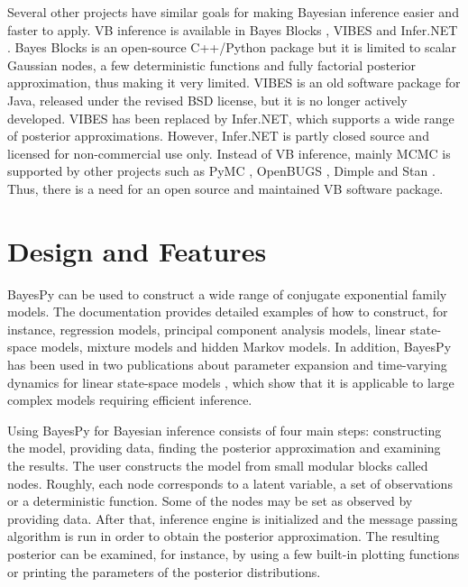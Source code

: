 \documentclass[twoside,11pt]{article}
\begin{document}
Several other projects have similar goals for making Bayesian inference easier
and faster to apply.  VB inference is available in Bayes Blocks
\citep{Raiko:2007}, VIBES \citep{Bishop:2002} and Infer.NET \citep{Infer.NET}.
Bayes Blocks is an open-source C++/Python package but it is limited to scalar
Gaussian nodes, a few deterministic functions and fully factorial posterior
approximation, thus making it very limited.  VIBES is an old software package
for Java, released under the revised BSD license, but it is no longer actively
developed.  VIBES has been replaced by Infer.NET, which supports a wide range of
posterior approximations.  However, Infer.NET is partly closed source and
licensed for non-commercial use only.  Instead of VB inference, mainly MCMC is
supported by other projects such as PyMC \citep{PyMC}, OpenBUGS \citep{OpenBUGS},
Dimple \citep{Dimple} and Stan \citep{Stan}.  Thus, there is a need for an open
source and maintained VB software package.



\section{Design and Features}


BayesPy can be used to construct a wide range of conjugate exponential family
models.  The documentation provides detailed examples of how to construct, for
instance, regression models, principal component analysis models, linear
state-space models, mixture models and hidden Markov models.  In addition,
BayesPy has been used in two publications about parameter expansion and
time-varying dynamics for linear state-space models
\citep{Luttinen:2013,Luttinen:2014}, which show that it is applicable to large
complex models requiring efficient inference.



Using BayesPy for Bayesian inference consists of four main steps: constructing
the model, providing data, finding the posterior approximation and examining the
results.  The user constructs the model from small modular blocks called nodes.
Roughly, each node corresponds to a latent variable, a set of observations or a
deterministic function.  Some of the nodes may be set as observed by providing
data.  After that, inference engine is initialized and the message passing
algorithm is run in order to obtain the posterior approximation.  The resulting
posterior can be examined, for instance, by using a few built-in plotting
functions or printing the parameters of the posterior distributions.
\end{document}
